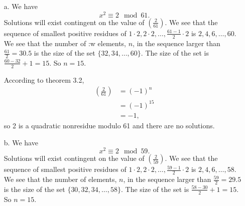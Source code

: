 \documentclass[12 pt]{amsart}
\begin{document}
	\begin{enumerate}
		\item[a.]
      We have 
      \[
        x^2 \equiv 2 \mod 61.
      \]
      Solutions will exist contingent on the value of
      $\left( \frac{2}{61} \right)$. 
      We see that the sequence of smallest
      positive residues of 
      $1\cdot 2, 2 \cdot 2, \ldots, \frac{61-1}{2} \cdot 2$ is
      $2, 4, 6, \ldots, 60$.
      We see that the number of :w
      elements, $n$, in the sequence larger than
      $\frac{61}{2} = 30.5$ is the size of the set
      $\{32, 34, \ldots, 60 \}$.
      The size of the set is $\frac{60 - 32}{2} + 1 = 15$. 
      So $n = 15$.

      According to theorem 3.2, 
      \begin{align*}
        \left( \frac{2}{61} \right) &= (-1)^n \\
                                    &= (-1)^{15} \\
                                    &= -1,
      \end{align*}
      so 2 is a quadratic nonresidue modulo 61 and there are no solutions.
		\item[b.]
      We have 
      \[
        x^2 \equiv 2 \mod 59.
      \]
      Solutions will exist contingent on the value of
      $\left( \frac{2}{59} \right)$. 
      We see that the sequence of smallest
      positive residues of 
      $1\cdot 2, 2 \cdot 2, \ldots, \frac{59-1}{2} \cdot 2$ is
      $2, 4, 6, \ldots, 58$.
      We see that the number of elements, $n$, in the sequence larger than
      $\frac{59}{2} = 29.5$ is the size of the set
      $\{30, 32, 34, \ldots, 58 \}$.
      The size of the set is $\frac{58 - 30}{2} + 1 = 15$. 
      So $n = 15$.


\end{enumerate}
\end{document}
